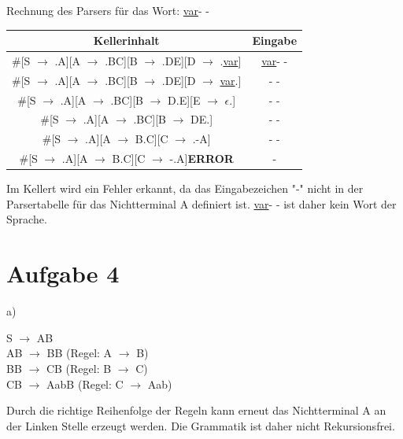 \documentclass[11pt,a4paper]{article}
\begin{document}
\begin{center}
    \bigskip
    Rechnung des Parsers für das Wort: \underline{var}- -
    \begin{longtable}{| c | c |}
        \hline
        Kellerinhalt & Eingabe \\
        \hline
        \#[S $\rightarrow$ .A][A $\rightarrow$ .BC][B $\rightarrow$ .DE][D $\rightarrow$ .\underline{var}] & \underline{var}- -\\
        \hline
        \#[S $\rightarrow$ .A][A $\rightarrow$ .BC][B $\rightarrow$ .DE][D $\rightarrow$ \underline{var}.] & - -\\
        \hline        
        \#[S $\rightarrow$ .A][A $\rightarrow$ .BC][B $\rightarrow$ D.E][E $\rightarrow$ $\epsilon$.] & - -\\
        \hline
        \#[S $\rightarrow$ .A][A $\rightarrow$ .BC][B $\rightarrow$ DE.] & - -\\
        \hline
        \#[S $\rightarrow$ .A][A $\rightarrow$ B.C][C $\rightarrow$ .-A] & - -\\
        \hline
        \#[S $\rightarrow$ .A][A $\rightarrow$ B.C][C $\rightarrow$ -.A]\textbf{ERROR} & -\\
        \hline
    \end{longtable}
    Im Kellert wird ein Fehler erkannt, da das Eingabezeichen "-" nicht in der Parsertabelle für das Nichtterminal A definiert ist. \underline{var}- -
    ist daher kein Wort der Sprache.
\end{center}
\section{Aufgabe 4}
a)
\begin{center}
    S $\rightarrow$ AB \\
    AB $\rightarrow$ BB (Regel: A $\rightarrow$ B) \\
    BB $\rightarrow$ CB (Regel: B $\rightarrow$ C) \\
    CB $\rightarrow$ AabB (Regel: C $\rightarrow$ Aab)
\end{center} 

Durch die richtige Reihenfolge der Regeln kann erneut das Nichtterminal A an der Linken Stelle erzeugt werden.
Die Grammatik ist daher nicht Rekursionsfrei.
\end{document}
